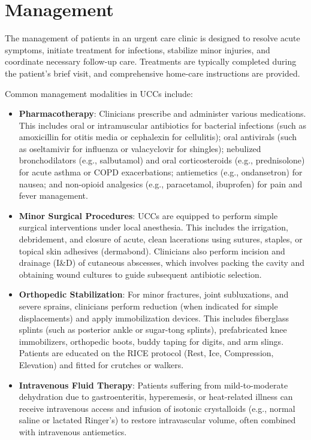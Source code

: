 \section*{Management}
The management of patients in an urgent care clinic is designed to resolve acute symptoms, initiate treatment for infections, stabilize minor injuries, and coordinate necessary follow-up care. Treatments are typically completed during the patient's brief visit, and comprehensive home-care instructions are provided.

Common management modalities in UCCs include:

\begin{itemize}
  \item \textbf{Pharmacotherapy}: Clinicians prescribe and administer various medications. This includes oral or intramuscular antibiotics for bacterial infections (such as amoxicillin for otitis media or cephalexin for cellulitis); oral antivirals (such as oseltamivir for influenza or valacyclovir for shingles); nebulized bronchodilators (e.g., salbutamol) and oral corticosteroids (e.g., prednisolone) for acute asthma or COPD exacerbations; antiemetics (e.g., ondansetron) for nausea; and non-opioid analgesics (e.g., paracetamol, ibuprofen) for pain and fever management.
  \item \textbf{Minor Surgical Procedures}: UCCs are equipped to perform simple surgical interventions under local anesthesia. This includes the irrigation, debridement, and closure of acute, clean lacerations using sutures, staples, or topical skin adhesives (dermabond). Clinicians also perform incision and drainage (I\&D) of cutaneous abscesses, which involves packing the cavity and obtaining wound cultures to guide subsequent antibiotic selection.
  \item \textbf{Orthopedic Stabilization}: For minor fractures, joint subluxations, and severe sprains, clinicians perform reduction (when indicated for simple displacements) and apply immobilization devices. This includes fiberglass splints (such as posterior ankle or sugar-tong splints), prefabricated knee immobilizers, orthopedic boots, buddy taping for digits, and arm slings. Patients are educated on the RICE protocol (Rest, Ice, Compression, Elevation) and fitted for crutches or walkers.
  \item \textbf{Intravenous Fluid Therapy}: Patients suffering from mild-to-moderate dehydration due to gastroenteritis, hyperemesis, or heat-related illness can receive intravenous access and infusion of isotonic crystalloids (e.g., normal saline or lactated Ringer's) to restore intravascular volume, often combined with intravenous antiemetics.

\end{itemize}
